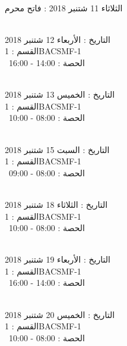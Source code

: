 \documentclass[14pt a4paper twocolumn]{book}
\begin{document}
\par
\noindent\makebox[\linewidth]{\rule{\paperwidth}{0.4pt}}
 \\
الثلاثاء 11 شتنبر 2018 :   فاتح محرم
\par
\noindent\makebox[\linewidth]{\rule{\paperwidth}{0.4pt}}
 \\
التاريخ : الأربعاء 12 شتنبر 2018 \\
القسم : 1BACSMF-1 \\
 \  
الحصة : 14:00 - 16:00 \\
\par
\noindent\makebox[\linewidth]{\rule{\paperwidth}{0.4pt}}
 \\
التاريخ : الخميس 13 شتنبر 2018 \\
القسم : 1BACSMF-1 \\
 \  
الحصة : 08:00 - 10:00 \\
\par
\noindent\makebox[\linewidth]{\rule{\paperwidth}{0.4pt}}
 \\
التاريخ : السبت 15 شتنبر 2018 \\
القسم : 1BACSMF-1 \\
 \  
الحصة : 08:00 - 09:00 \\
\par
\noindent\makebox[\linewidth]{\rule{\paperwidth}{0.4pt}}
 \\
التاريخ : الثلاثاء 18 شتنبر 2018 \\
القسم : 1BACSMF-1 \\
 \  
الحصة : 08:00 - 10:00 \\
\par
\noindent\makebox[\linewidth]{\rule{\paperwidth}{0.4pt}}
 \\
التاريخ : الأربعاء 19 شتنبر 2018 \\
القسم : 1BACSMF-1 \\
 \  
الحصة : 14:00 - 16:00 \\
\par
\noindent\makebox[\linewidth]{\rule{\paperwidth}{0.4pt}}
 \\
التاريخ : الخميس 20 شتنبر 2018 \\
القسم : 1BACSMF-1 \\
 \  
الحصة : 08:00 - 10:00 \\
\par
\end{document}
